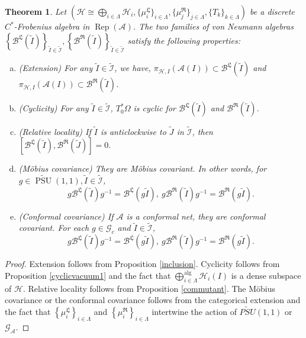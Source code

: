\documentclass{article}
\newtheorem{theorem}{Theorem}
\newcommand{\hilb}{\mathcal{H}}
\newcommand{\B}{\mathcal{B}}
\newcommand{\A}{\mathcal{A}}
\begin{document}
\begin{theorem}\label{relative local extensions}
    Let $(\hilb \cong \bigoplus_{i\in\Lambda}\hilb_i, \{\mu_i^{\mathfrak{L}}\}_{i\in\Lambda}, \{\mu_j^{\mathfrak{R}}\}_{j\in\Lambda }, \{T_k\}_{k\in\Lambda})$ be a discrete  $C^*$-Frobenius algebra in $\operatorname{Rep}(\A)$. The two families of von Neumann algebras $\left\{\B^{\mathfrak{L}}(\widetilde{I})\right\}_{\widetilde{I}\in\widetilde{\mathcal{I}}}, \left\{\B^{\mathfrak{R}} (\widetilde{I})\right\}_{\widetilde{I}\in\widetilde{\mathcal{I}}}$  satisfy the following properties:
    \begin{enumerate}[(a)]
        \item (Extension) For any $\widetilde{I} \in \widetilde{\mathcal{I}}$, we have, 
        $\pi_{\hilb, I}(\A(I)) \subset \B^\mathfrak{L}(\widetilde{I})$ and 
        $\pi_{\hilb, I}(\A(I)) \subset \B^\mathfrak{R}(\widetilde{I})$.
        \item (Cyclicity) For any $\widetilde{I}
        \in\widetilde{\mathcal{I}}$, $T_0^*\Omega$ is cyclic for
        $\B^{\mathfrak{L}}(\widetilde{I})$ and $\B^{\mathfrak{R}}(\widetilde{I})$.
        \item (Relative locality) If $\widetilde{I}$ is anticlockwise to $\widetilde{J}$ in $\widetilde{\mathcal{I}}$, then
$[\B^{\mathfrak{L}}(\widetilde{I}), \B^{\mathfrak{R}}(\widetilde{J})]= 0.$
        \item (M\"{o}bius covariance) They are M\"{o}bius covariant. In other words, for $g\in\widetilde{\operatorname{PSU}}(1,1), \widetilde{I} \in\widetilde{\mathcal{I}}$, 
        \[
        g \B^{\mathfrak{L}}(\widetilde{I})g^{-1} =  \B^{\mathfrak{L}}(g\widetilde{I}), 
        \ g \B^{\mathfrak{R}}(\widetilde{I})g^{-1} =  \B^{\mathfrak{R}}(g\widetilde{I}).
        \]
        \item (Conformal covariance) If $\A$ is a conformal net, they are conformal covariant. For each $g\in\mathcal{G}_c$ and $\widetilde{I} \in\widetilde{\mathcal{I}}$, 
        \[
        g \B^{\mathfrak{L}}(\widetilde{I})g^{-1} =  \B^{\mathfrak{L}}(g\widetilde{I}), 
        \ g \B^{\mathfrak{R}}(\widetilde{I})g^{-1} =  \B^{\mathfrak{R}}(g\widetilde{I}).
        \]
    \end{enumerate}
\end{theorem}
\begin{proof}
Extension follows from Proposition \ref{inclusion}.
Cyclicity follows from Proposition \ref{cyclicvacuum1} and the fact that
$\bigoplus^{\operatorname{alg}}_{i\in\Lambda}\hilb_i(I)$ is a dense subspace of $\hilb$. Relative locality follows from Proposition \ref{commutant}.   
The M\"{o}bius covariance or the conformal covariance follows from the categorical extension and the fact that $\left\{\mu_i^\mathfrak{L}\right\}_{i\in\Lambda}$ and $\left\{\mu_i^\mathfrak{R}\right\}_{i\in\Lambda}$ intertwine the action of $\widetilde{PSU}(1,1)$ or $\mathcal{G}_\A$.
\end{proof}
\end{document}
